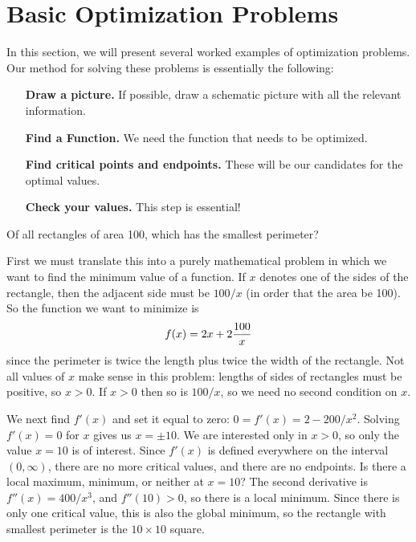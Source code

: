 \section{Basic Optimization Problems}


In this section, we will present several worked examples of
optimization problems. Our method for solving these problems is
essentially the following:


\begin{guidelinesForOptimization}\hfil
\begin{itemize}
\item[\textbf{Draw a picture.}] If possible, draw a schematic picture with all the relevant information. 
\item[\textbf{Find a Function.}] We need the function that needs to be optimized. 
\item[\textbf{Find critical points and endpoints.}] These will be our
  candidates for the optimal values.
\item[\textbf{Check your values.} ] This step is essential!
\end{itemize}
\end{guidelinesForOptimization}

\begin{example}
Of all rectangles of area 100, which has the smallest perimeter?
\end{example}

\begin{solution}
First we must translate this into a purely mathematical problem in
which we want to find the minimum value of a function.
If $x$ denotes one of the sides of the rectangle, then the adjacent side
must be $100/x$ (in order that the area be 100).  So the function we want
to minimize is 
$$
  f(x)=2x+2{100\over x}
$$
since the perimeter is twice the length plus twice the width of the
rectangle. Not all values of $x$ make sense in this problem: lengths
of sides of rectangles must be positive, so $x>0$. If $x>0$ then so is
$100/x$, so we need no second condition on $x$.

We next find $f'(x)$ and set it equal to zero: $0=f'(x)=2-200/x^2$.
Solving $f'(x)=0$ for $x$ gives us $x=\pm 10$. We are interested only
in $x>0$, so only the value $x=10$ is of interest. Since $f'(x)$ is
defined everywhere on the interval $(0,\infty)$, there are no more
critical values, and there are no endpoints. Is there a local maximum,
minimum, or neither at $x=10$? The second derivative is
$f''(x)=400/x^3$, and $f''(10)>0$, so there is a local minimum. Since
there is only one critical value, this is also the global minimum, so the
rectangle with smallest perimeter is the $10\times10$ square.
\end{solution}

